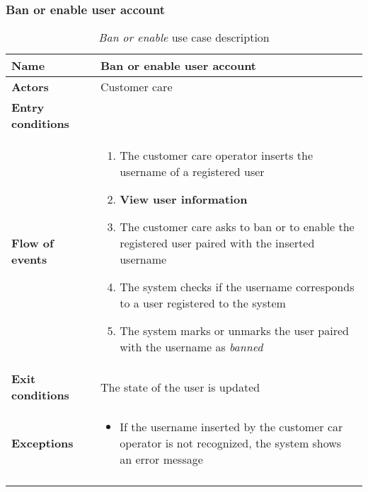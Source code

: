 \subsubsection{Ban or enable user account}
\begin{longtable}{p{0.25\linewidth}p{0.75\linewidth}}
\toprule
\textbf{Name} & \textbf{Ban or enable user account} \\
\midrule
\textbf{Actors} &  Customer care\\
\midrule
\textbf{Entry conditions} & \\
\midrule
\textbf{Flow of events} & 
\begin{enumerate}
	\item The customer care operator inserts the username of a registered user
	\item \textbf{View user information}
	\item The customer care asks to ban or to enable the registered user paired with the inserted
	username
	\item The system checks if the username corresponds to a user registered to the system
	\item The system marks or unmarks the user paired with the username as \emph{banned}
\end{enumerate} \\
\midrule
\textbf{Exit conditions} & The state of the user is updated \\
\midrule
\textbf{Exceptions} & 
\begin{itemize}
	\item If the username inserted by the customer car operator is not recognized, the system shows an error message
\end{itemize} \\
\bottomrule
\caption{\emph{Ban or enable} use case description}
\end{longtable}